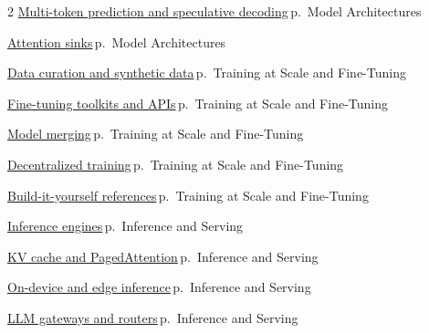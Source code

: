 \documentclass[10pt,a4paper,openany]{report}
\begin{document}
\begin{multicols}{2}
\hyperref[c:arch-6]{Multi-token prediction and speculative decoding}\,{\color{muted}\scriptsize p.\,\pageref{c:arch-6}} {\color{muted}\scriptsize Model Architectures}\par\vspace{2pt}
\hyperref[c:arch-8]{Attention sinks}\,{\color{muted}\scriptsize p.\,\pageref{c:arch-8}} {\color{muted}\scriptsize Model Architectures}\par\vspace{2pt}
\hyperref[c:training-3]{Data curation and synthetic data}\,{\color{muted}\scriptsize p.\,\pageref{c:training-3}} {\color{muted}\scriptsize Training at Scale and Fine-Tuning}\par\vspace{2pt}
\hyperref[c:training-6]{Fine-tuning toolkits and APIs}\,{\color{muted}\scriptsize p.\,\pageref{c:training-6}} {\color{muted}\scriptsize Training at Scale and Fine-Tuning}\par\vspace{2pt}
\hyperref[c:training-7]{Model merging}\,{\color{muted}\scriptsize p.\,\pageref{c:training-7}} {\color{muted}\scriptsize Training at Scale and Fine-Tuning}\par\vspace{2pt}
\hyperref[c:training-8]{Decentralized training}\,{\color{muted}\scriptsize p.\,\pageref{c:training-8}} {\color{muted}\scriptsize Training at Scale and Fine-Tuning}\par\vspace{2pt}
\hyperref[c:training-9]{Build-it-yourself references}\,{\color{muted}\scriptsize p.\,\pageref{c:training-9}} {\color{muted}\scriptsize Training at Scale and Fine-Tuning}\par\vspace{2pt}
\hyperref[c:inference-0]{Inference engines}\,{\color{muted}\scriptsize p.\,\pageref{c:inference-0}} {\color{muted}\scriptsize Inference and Serving}\par\vspace{2pt}
\hyperref[c:inference-1]{KV cache and PagedAttention}\,{\color{muted}\scriptsize p.\,\pageref{c:inference-1}} {\color{muted}\scriptsize Inference and Serving}\par\vspace{2pt}
\hyperref[c:inference-6]{On-device and edge inference}\,{\color{muted}\scriptsize p.\,\pageref{c:inference-6}} {\color{muted}\scriptsize Inference and Serving}\par\vspace{2pt}
\hyperref[c:inference-7]{LLM gateways and routers}\,{\color{muted}\scriptsize p.\,\pageref{c:inference-7}} {\color{muted}\scriptsize Inference and Serving}\par\vspace{2pt}

\end{multicols}
\end{document}
